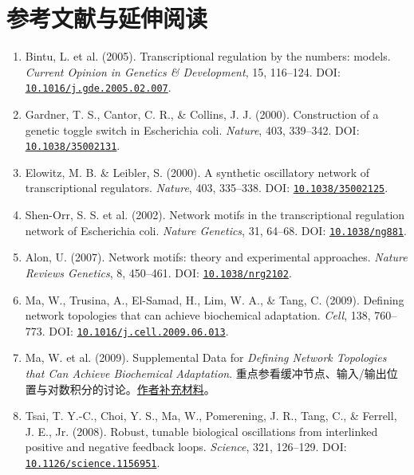 \documentclass[11pt,a4paper,UTF8,fontset=fandol]{ctexart}
\begin{document}
\clearpage\section*{参考文献与延伸阅读}
\begin{enumerate}[leftmargin=*,itemsep=2pt,parsep=0pt]\small
\item Bintu, L. et al. (2005). Transcriptional regulation by the numbers: models. \emph{Current Opinion in Genetics \& Development}, 15, 116--124. DOI: \href{https://doi.org/10.1016/j.gde.2005.02.007}{\nolinkurl{10.1016/j.gde.2005.02.007}}.
\item Gardner, T. S., Cantor, C. R., \& Collins, J. J. (2000). Construction of a genetic toggle switch in Escherichia coli. \emph{Nature}, 403, 339--342. DOI: \href{https://doi.org/10.1038/35002131}{\nolinkurl{10.1038/35002131}}.
\item Elowitz, M. B. \& Leibler, S. (2000). A synthetic oscillatory network of transcriptional regulators. \emph{Nature}, 403, 335--338. DOI: \href{https://doi.org/10.1038/35002125}{\nolinkurl{10.1038/35002125}}.
\item Shen-Orr, S. S. et al. (2002). Network motifs in the transcriptional regulation network of Escherichia coli. \emph{Nature Genetics}, 31, 64--68. DOI: \href{https://doi.org/10.1038/ng881}{\nolinkurl{10.1038/ng881}}.
\item Alon, U. (2007). Network motifs: theory and experimental approaches. \emph{Nature Reviews Genetics}, 8, 450--461. DOI: \href{https://doi.org/10.1038/nrg2102}{\nolinkurl{10.1038/nrg2102}}.
\item Ma, W., Trusina, A., El-Samad, H., Lim, W. A., \& Tang, C. (2009). Defining network topologies that can achieve biochemical adaptation. \emph{Cell}, 138, 760--773. DOI: \href{https://doi.org/10.1016/j.cell.2009.06.013}{\nolinkurl{10.1016/j.cell.2009.06.013}}.
\item Ma, W. et al. (2009). Supplemental Data for \emph{Defining Network Topologies that Can Achieve Biochemical Adaptation}. 重点参看缓冲节点、输入/输出位置与对数积分的讨论。\href{https://ucsf-cmp.github.io/lim-lab/papers/pdfs/wm_2009_supp.pdf}{作者补充材料}。
\item Tsai, T. Y.-C., Choi, Y. S., Ma, W., Pomerening, J. R., Tang, C., \& Ferrell, J. E., Jr. (2008). Robust, tunable biological oscillations from interlinked positive and negative feedback loops. \emph{Science}, 321, 126--129. DOI: \href{https://doi.org/10.1126/science.1156951}{\nolinkurl{10.1126/science.1156951}}.
\end{enumerate}
\end{document}
